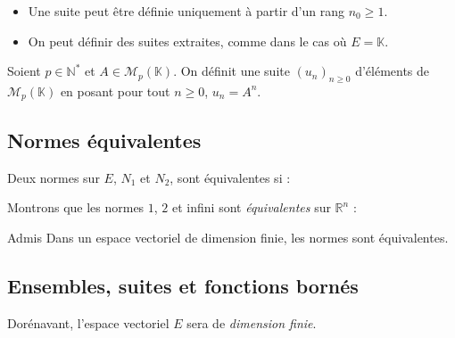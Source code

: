 \documentclass[french,11pt,twoside]{VcCours}
\begin{document}
\begin{Remarques}{}
\begin{itemize} 
\item Une suite peut être définie uniquement à partir d'un rang $n_0 \geq 1$.
\item On peut définir des suites extraites, comme dans le cas où $E = \mathbb{K}$.
\end{itemize}
\end{Remarques}{}

\medskip

\begin{Exemple} Soient $p \in \mathbb{N}^{*}$ et $A \in \mathcal{M}_p(\mathbb{K})$. On définit une suite $(u_n)_{n \geq 0}$ d'éléments de $\mathcal{M}_p(\mathbb{K})$ en posant pour tout $n \geq 0$, $u_n = A^n$. 
\end{Exemple}

\subsection{Normes équivalentes}

\begin{Definition}{} Deux normes sur $E$, $N_1$ et $N_2$, sont équivalentes si :

\vspace{1cm}
\end{Definition}

\begin{Exemple} Montrons que les normes $1$, $2$ et infini sont \emph{équivalentes} sur $\mathbb{R}^n$ :

\vspace{7cm}
\end{Exemple}

\begin{Theoreme}{Admis} Dans un espace vectoriel de dimension finie, les normes sont équivalentes.
\end{Theoreme}

\subsection{Ensembles, suites et fonctions bornés}

Dorénavant, l'espace vectoriel $E$ sera de \emph{dimension finie}.
\end{document}
